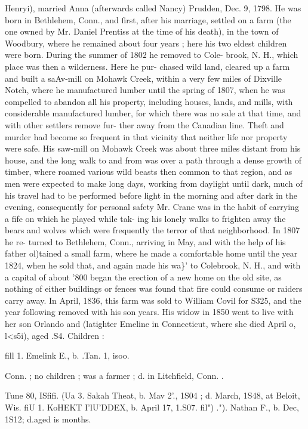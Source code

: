 \documentclass[oneside]{book}
\begin{document}
Henryi), married Anna (afterwards called Nancy) Prudden, 
Dec. 9, 1798. He was born in Bethlehem, Conn., and first, after 
his marriage, settled on a farm (the one owned by Mr. Daniel 
Prentiss at the time of his death), in the town of Woodbury, 
where he remained about four years ; here his two eldest children 
were born. During the summer of 1802 he removed to Cole- 
brook, N. H., which place was then a wilderness. Here he pur- 
chased wild land, cleared up a farm and built a saAv-mill on 
Mohawk Creek, within a very few miles of Dixville Notch, where 
he manufactured lumber until the spring of 1807, when he was 
compelled to abandon all his property, including houses, lands, 
and mills, with considerable manufactured lumber, for which 
there was no sale at that time, and with other settlers remove fur- 
ther away from the Canadian line. Theft and murder had become 
so frequent in that vicinity that neither life nor property were safe. 
His saw-mill on Mohawk Creek was about three miles distant 
from his house, and the long walk to and from was over a path 
through a dense growth of timber, where roamed various wild 
beasts then common to that region, and as men were expected to 
make long days, working from daylight until dark, much of his 
travel had to be performed before light in the morning and after 
dark in the evening, consequently for personal safety Mr. Crane 
was in the habit of carrying a fife on which he played while tak- 
ing his lonely walks to frighten away the bears and wolves which 
were frequently the terror of that neighborhood. In 1807 he re- 
turned to Bethlehem, Conn., arriving in May, and with the help 
of his father ol)tained a small farm, where he made a comfortable 
home until the year 1824, when he sold that, and again made his 
wa\}' to Colebrook, N. H., and with a capital of about '800 began 
the erection of a new home on the old site, as nothing of either 
buildings or fences was found that fire could consume or raiders 
carry away. In April, 1836, this farm was sold to William 
Covil for S325, and the year following removed with his son 
years. His widow in 1850 went to live with her son Orlando and 
(latighter Emeline in Connecticut, where she died April o, l<s5i), 
aged .S4. Children : 

fill 1. Emelink E., b. .Tan. 1, isoo. 


Conn. ; no children ; was a farmer ; d. in Litchfield, Conn. . 

Tune 80, ISfifi. 
(Ua 3. Sakah Theat, b. Mav 2'., 1S04 ; d. March, 1S48, at Beloit, Wis. 
fiU 1. KoHEKT I'lU'DDEX, b. April 17, 1.S07. 
fil")  ."). Nathan F., b. Dec, 1S12; d.aged is months. 
\end{document}
